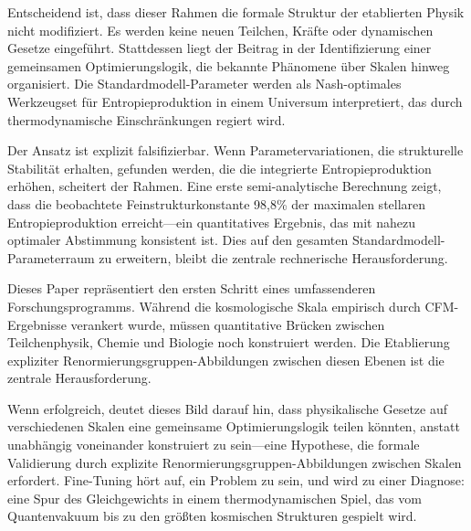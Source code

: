 \documentclass[12pt,a4paper]{article}
\theoremstyle{remark}
\begin{document}
Entscheidend ist, dass dieser Rahmen die formale Struktur der etablierten Physik nicht modifiziert. Es werden keine neuen Teilchen, Kr\"afte oder dynamischen Gesetze eingef\"uhrt. Stattdessen liegt der Beitrag in der Identifizierung einer gemeinsamen Optimierungslogik, die bekannte Ph\"anomene \"uber Skalen hinweg organisiert. Die Standardmodell-Parameter werden als Nash-optimales Werkzeugset f\"ur Entropieproduktion in einem Universum interpretiert, das durch thermodynamische Einschr\"ankungen regiert wird.

Der Ansatz ist explizit falsifizierbar. Wenn Parametervariationen, die strukturelle Stabilit\"at erhalten, gefunden werden, die die integrierte Entropieproduktion erh\"ohen, scheitert der Rahmen. Eine erste semi-analytische Berechnung zeigt, dass die beobachtete Feinstrukturkonstante 98,8\% der maximalen stellaren Entropieproduktion erreicht---ein quantitatives Ergebnis, das mit nahezu optimaler Abstimmung konsistent ist. Dies auf den gesamten Standardmodell-Parameterraum zu erweitern, bleibt die zentrale rechnerische Herausforderung.

Dieses Paper repr\"asentiert den ersten Schritt eines umfassenderen Forschungsprogramms. W\"ahrend die kosmologische Skala empirisch durch CFM-Ergebnisse verankert wurde, m\"ussen quantitative Br\"ucken zwischen Teilchenphysik, Chemie und Biologie noch konstruiert werden. Die Etablierung expliziter Renormierungsgruppen-Abbildungen zwischen diesen Ebenen ist die zentrale Herausforderung.

Wenn erfolgreich, deutet dieses Bild darauf hin, dass physikalische Gesetze auf verschiedenen Skalen eine gemeinsame Optimierungslogik teilen k\"onnten, anstatt unabh\"angig voneinander konstruiert zu sein---eine Hypothese, die formale Validierung durch explizite Renormierungsgruppen-Abbildungen zwischen Skalen erfordert. Fine-Tuning h\"ort auf, ein Problem zu sein, und wird zu einer Diagnose: eine Spur des Gleichgewichts in einem thermodynamischen Spiel, das vom Quantenvakuum bis zu den gr\"o\ss{}ten kosmischen Strukturen gespielt wird.

\end{document}
